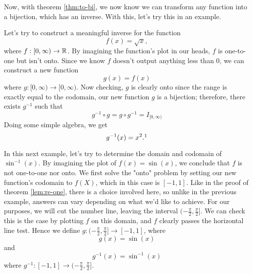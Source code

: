 Now, with theorem \eqref{thm:to-bi}, we now know we can transform any function into a bijection, which has an inverse. With this, let's try this in an example.
\begin{ex}
	Let's try to construct a meaningful inverse for the function
	$$f(x)=\sqrt{x},$$
	where $f:[0,\infty)\to \mathbb{R}$.
	By imagining the function's plot in our heads, $f$ is one-to-one but isn't onto. Since we know $f$ doesn't output anything less than 0, we can construct a new function 
	$$g(x)=f(x)$$
	where $g:[0,\infty)\to [0,\infty)$. Now checking, $g$ is clearly onto since the range is exactly equal to the codomain, our new function $g$ is a bijection; therefore, there exists $g^{-1}$ such that
	$$g^{-1}\circ g=g\circ g^{-1}=I_{[0,\infty)}$$
	Doing some simple algebra, we get
	$$g^{-1}(x)=x^2.\footnotemark$$
\end{ex}

\begin{ex}
	In this next example, let's try to determine the domain and codomain of $\sin^{-1}(x)$. By imagining the plot of $f(x)=\sin(x)$, we conclude that $f$ is not one-to-one nor onto. We first solve the "onto" problem by setting our new function's codomain to $f(X)$, which in this case is $[-1,1]$. 
	Like in the proof of theorem \eqref{lem:re-one}, there is a choice involved here, so unlike in the previous example, answers can vary depending on what we'd like to achieve.
	For our purposes, we will cut the number line, leaving the interval $(-\frac{\pi}{2},\frac{\pi}{2}]$.
	We can check this is the case by plotting $f$ on this domain, and $f$ clearly passes the horizontal line test. Hence we define $g: (-\frac{\pi}{2},\frac{\pi}{2}] \to [-1,1]$, where
	$$g(x)=\sin(x)$$
	and
	$$g^{-1}(x)=\sin^{-1}(x)$$
	where $g^{-1}: [-1,1] \to (-\frac{\pi}{2},\frac{\pi}{2}]$.
\end{ex}

